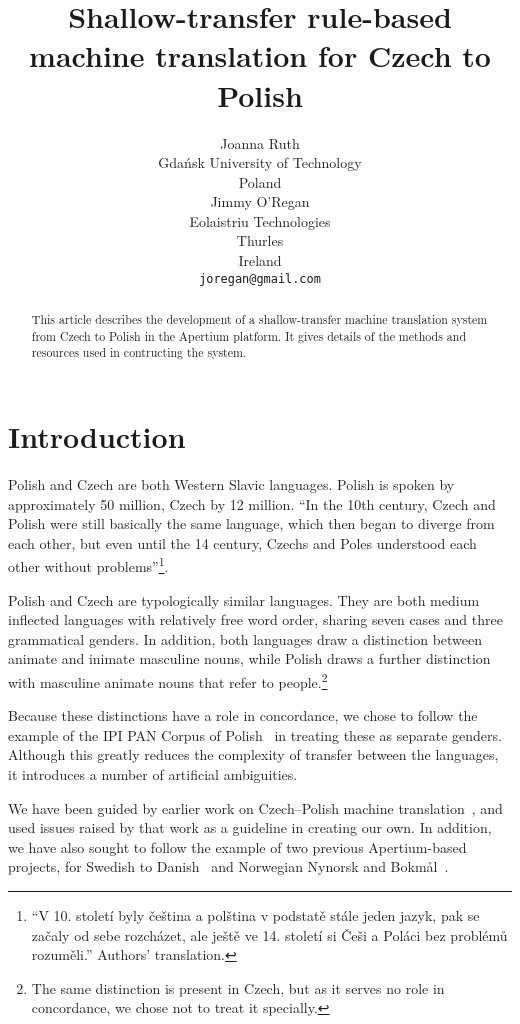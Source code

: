 \documentclass[11pt]{article}
\title{Shallow-transfer rule-based machine translation for Czech to Polish}
\author{Joanna Ruth\\
  Gdańsk University of Technology \\
  Poland \\
  \And
  Jimmy O'Regan \\
  Eolaistriu Technologies \\
  Thurles \\
  Ireland \\  
  {\tt joregan@gmail.com}}
\date{}
\begin{document}
\maketitle

\begin{abstract}
This article describes the development of a shallow-transfer machine translation
system from Czech to Polish in the Apertium platform. It gives details of the
methods and resources used in contructing the system. 
\end{abstract}

\section{Introduction}

Polish and Czech are both Western Slavic languages. Polish is spoken by
approximately 50 million, Czech by 12 million.
``In the 10th century, Czech and Polish were still basically the same language, 
which then began to diverge from each other, but even until the 14 century, 
Czechs and Poles understood each other without problems''\footnote{``V 10. 
století byly čeština a polština v podstatě stále jeden jazyk, pak se začaly 
od sebe rozcházet, ale ještě ve 14. století si Češi a Poláci bez problémů rozuměli.''
Authors' translation.}.~\citep{wiki:polstina}

Polish and Czech are typologically similar languages. They are both medium inflected 
languages with relatively free word order, sharing seven cases and three grammatical 
genders. In addition, both languages draw a distinction between animate and inimate 
masculine nouns, while Polish draws a further distinction with masculine animate 
nouns that refer to people.\footnote{The same distinction is present in Czech, but
as it serves no role in concordance, we chose not to treat it specially.}

Because these distinctions have a role in concordance, we chose to 
follow the example of the IPI PAN Corpus of Polish~\citep{prze:04ce} in treating these 
as separate genders. Although this greatly reduces the complexity of transfer between 
the languages, it introduces a number of artificial ambiguities.

We have been guided by earlier work on Czech--Polish machine translation~\citep{Debowski02}, 
and used issues raised by that work as a guideline in creating our own. In addition, we 
have also sought to follow the example of two previous Apertium-based projects, for Swedish to 
Danish~\citep{tyers2009rfr} and Norwegian Nynorsk and Bokm{\aa}l~\citep{unhammer2009rfr}.
\end{document}
